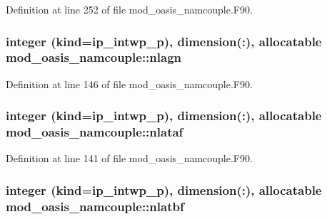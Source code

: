 Definition at line 252 of file mod\+\_\+oasis\+\_\+namcouple.\+F90.

\hypertarget{classmod__oasis__namcouple_aad06af35c92de78d71671d39bcbb1690}{
\subsubsection[{nlagn}]{\setlength{\rightskip}{0pt plus 5cm}integer (kind=ip\+\_\+intwp\+\_\+p), dimension(\+:), allocatable mod\+\_\+oasis\+\_\+namcouple\+::nlagn\hspace{0.3cm}{\ttfamily [private]}}}\label{classmod__oasis__namcouple_aad06af35c92de78d71671d39bcbb1690}


Definition at line 146 of file mod\+\_\+oasis\+\_\+namcouple.\+F90.

\hypertarget{classmod__oasis__namcouple_a80d81b2f026a2d0dc2de27b9ee04f7af}{
\subsubsection[{nlataf}]{\setlength{\rightskip}{0pt plus 5cm}integer (kind=ip\+\_\+intwp\+\_\+p), dimension(\+:), allocatable mod\+\_\+oasis\+\_\+namcouple\+::nlataf\hspace{0.3cm}{\ttfamily [private]}}}\label{classmod__oasis__namcouple_a80d81b2f026a2d0dc2de27b9ee04f7af}


Definition at line 141 of file mod\+\_\+oasis\+\_\+namcouple.\+F90.

\hypertarget{classmod__oasis__namcouple_a9b09ac96dad78313003a9436fe2f9aec}{
\subsubsection[{nlatbf}]{\setlength{\rightskip}{0pt plus 5cm}integer (kind=ip\+\_\+intwp\+\_\+p), dimension(\+:), allocatable mod\+\_\+oasis\+\_\+namcouple\+::nlatbf\hspace{0.3cm}{\ttfamily [private]}}}\label{classmod__oasis__namcouple_a9b09ac96dad78313003a9436fe2f9aec}


